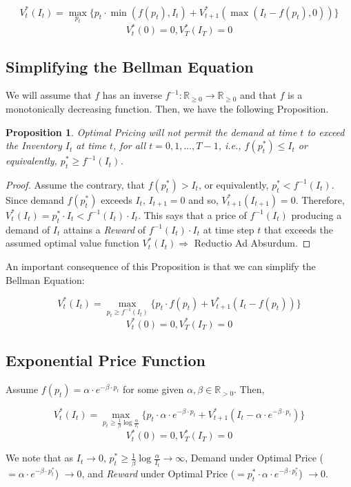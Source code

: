 \documentclass[12pt]{amsart}
\newtheorem{prop}{Proposition}
\begin{document}
   $$V_t^*(I_t) = \max_{p_t} \{ p_t \cdot \min(f(p_t), I_t) + V_{t+1}^*(\max(I_t - f(p_t), 0)) \}$$
   $$V_t^*(0) = 0,  V_T^*(I_T) = 0$$
  
  \subsection{Simplifying the Bellman Equation}
  We will assume that $f$ has an inverse $f^{-1} : \mathbb{R}_{\geq 0} \rightarrow \mathbb{R}_{\geq 0}$ and that $f$ is a monotonically decreasing function. Then, we have the following Proposition.
  \begin{prop}
  Optimal Pricing will not permit the demand at time $t$ to exceed the Inventory $I_t$ at time $t$, for all $t = 0, 1, \ldots, T-1$, i.e., $f(p_t^*) \leq I_t$ or equivalently, $p_t^* \geq f^{-1}(I_t)$.
  \end{prop}
  \begin{proof}
  Assume the contrary, that $f(p_t^*) > I_t$, or equivalently, $p_t^* < f^{-1}(I_t)$. Since demand $f(p_t^*)$ exceeds $I_t$, $I_{t+1} = 0$ and so, $V_{t+1}^*(I_{t+1}) = 0$. Therefore, $V_t^*(I_t) = p_t^* \cdot I_t < f^{-1}(I_t) \cdot I_t$. This says that a price of $f^{-1}(I_t)$ producing a demand of $I_t$ attains a {\em Reward} of  $f^{-1}(I_t) \cdot I_t$ at time step $t$ that exceeds the assumed optimal value function $V_t^*(I_t) \Rightarrow $ Reductio Ad Absurdum.
  \end{proof}
  
  An important consequence of this Proposition is that we can simplify the Bellman Equation:
  
  $$V_t^*(I_t) = \max_{p_t \geq f^{-1}(I_t)} \{ p_t \cdot f(p_t) + V_{t+1}^*(I_t - f(p_t)) \}$$
   $$V_t^*(0) = 0,  V_T^*(I_T) = 0$$

   \subsection{Exponential Price Function}
   Assume $f(p_t) = \alpha \cdot e^{-\beta \cdot p_t}$ for some given $\alpha, \beta \in \mathbb{R}_{> 0}$. Then,
   
   $$V_t^*(I_t) = \max_{p_t \geq \frac 1 \beta \log \frac \alpha {I_t}} \{ p_t \cdot \alpha \cdot e^{-\beta \cdot p_t}  + V_{t+1}^*(I_t - \alpha \cdot e^{-\beta \cdot p_t}) \}$$
   $$V_t^*(0) = 0, V_T^*(I_T) = 0$$
   
   We note that as $I_t \to 0$, $p_t^* \geq \frac 1 \beta \log \frac \alpha {I_t} \to \infty$, Demand under Optimal Price ($= \alpha \cdot e^{-\beta \cdot p_t^*}$) $\to 0$, and {\em Reward} under Optimal Price ($= p_t^* \cdot \alpha \cdot e^{-\beta \cdot p_t^*}$) $\to 0$.
   
\end{document}
